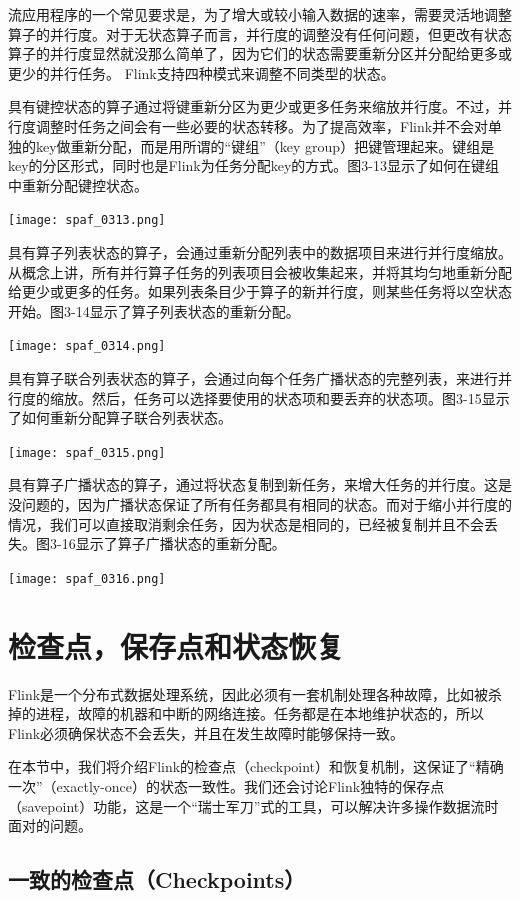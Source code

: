 \documentclass[oneside]{ctexbook}
\begin{document}
流应用程序的一个常见要求是，为了增大或较小输入数据的速率，需要灵活地调整算子的并行度。对于无状态算子而言，并行度的调整没有任何问题，但更改有状态算子的并行度显然就没那么简单了，因为它们的状态需要重新分区并分配给更多或更少的并行任务。 Flink支持四种模式来调整不同类型的状态。

具有键控状态的算子通过将键重新分区为更少或更多任务来缩放并行度。不过，并行度调整时任务之间会有一些必要的状态转移。为了提高效率，Flink并不会对单独的key做重新分配，而是用所谓的“键组”（key group）把键管理起来。键组是key的分区形式，同时也是Flink为任务分配key的方式。图3-13显示了如何在键组中重新分配键控状态。

\noindent \texttt{[image: spaf\_0313.png]}

具有算子列表状态的算子，会通过重新分配列表中的数据项目来进行并行度缩放。从概念上讲，所有并行算子任务的列表项目会被收集起来，并将其均匀地重新分配给更少或更多的任务。如果列表条目少于算子的新并行度，则某些任务将以空状态开始。图3-14显示了算子列表状态的重新分配。

\noindent \texttt{[image: spaf\_0314.png]}

具有算子联合列表状态的算子，会通过向每个任务广播状态的完整列表，来进行并行度的缩放。然后，任务可以选择要使用的状态项和要丢弃的状态项。图3-15显示了如何重新分配算子联合列表状态。

\noindent \texttt{[image: spaf\_0315.png]}

具有算子广播状态的算子，通过将状态复制到新任务，来增大任务的并行度。这是没问题的，因为广播状态保证了所有任务都具有相同的状态。而对于缩小并行度的情况，我们可以直接取消剩余任务，因为状态是相同的，已经被复制并且不会丢失。图3-16显示了算子广播状态的重新分配。

\noindent \texttt{[image: spaf\_0316.png]}

\section{检查点，保存点和状态恢复}

Flink是一个分布式数据处理系统，因此必须有一套机制处理各种故障，比如被杀掉的进程，故障的机器和中断的网络连接。任务都是在本地维护状态的，所以Flink必须确保状态不会丢失，并且在发生故障时能够保持一致。

在本节中，我们将介绍Flink的检查点（checkpoint）和恢复机制，这保证了“精确一次”（exactly-once）的状态一致性。我们还会讨论Flink独特的保存点（savepoint）功能，这是一个“瑞士军刀”式的工具，可以解决许多操作数据流时面对的问题。

\subsection{一致的检查点（Checkpoints）}
\end{document}
